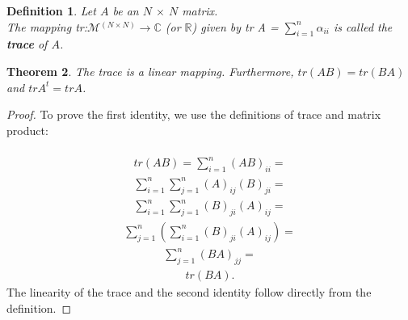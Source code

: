 \documentclass[12pt,a4paper]{article}
\newtheorem{thm}{Theorem}
\newtheorem{defn}[thm]{Definition}
\begin{document}
\begin{defn}
Let $A$ be an $N$ $\times$ $N$ matrix. \\The mapping tr:$\mathcal{M}$$^{(N\times N)}$$\to$$\mathbb{C}$ (or $\mathbb{R}$) given by tr A = $\sum_{i=1}^{n}$$ \alpha_{ii} $ is called the \textbf{trace} of $A$.
\end{defn}
\begin{thm}
The trace is a linear mapping. Furthermore, $tr(AB) = tr(BA)$ and $trA^t = trA$.
\end{thm}
\begin{proof}
To prove the first identity, we use the definitions of trace and matrix product:\\\\
\begin{align*}
tr(AB) = \sum_{i=1}^{n}(AB)_{ii} =
\end{align*}
\begin{align*}
\sum_{i=1}^{n} \sum_{j=1}^{n}(A)_{ij}(B)_{ji} =
\end{align*}
\begin{align*}
\sum_{i=1}^{n} \sum_{j=1}^{n}(B)_{ji}(A)_{ij} =
\end{align*}
\begin{align*}
 \sum_{j=1}^{n} ( \sum_{i=1}^{n}(B)_{ji}(A)_{ij}) =
 \end{align*}
\begin{align*}
\sum_{j=1}^{n}(BA)_{jj} =
\end{align*}
\begin{align*}
tr(BA).
\end{align*}
The linearity of the trace and the second identity follow directly from the definition.
\end{proof}
\end{document}
